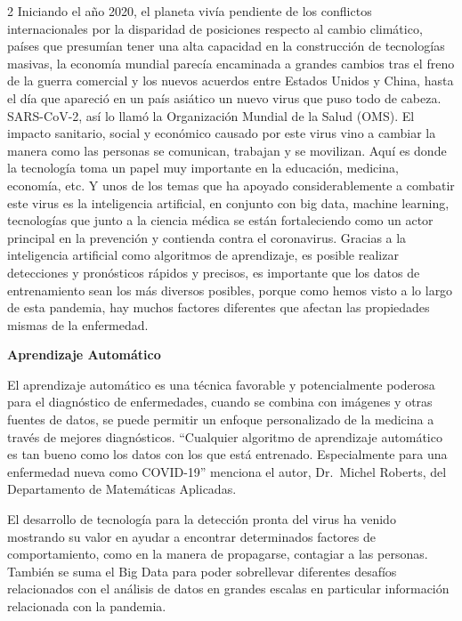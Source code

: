 \documentclass[12pt,spanish,Letterpaper,openany]{book}
\newcommand{\spacethreemilis}{\vspace{3mm}}
\begin{document}
\begin {multicols}{2}
Iniciando el año 2020, el planeta vivía pendiente de los conflictos internacionales por la
disparidad de posiciones respecto al cambio climático, países que presumían tener una alta
capacidad en la construcción de tecnologías masivas, la economía mundial parecía
encaminada a grandes cambios tras el freno de la guerra comercial y los nuevos acuerdos
entre Estados Unidos y China, hasta el día que apareció en un país asiático un nuevo virus
que puso todo de cabeza. SARS-CoV-2, así lo llamó la Organización Mundial de la Salud
(OMS).
El impacto sanitario, social y económico causado por este virus vino a cambiar la manera
como las personas se comunican, trabajan y se movilizan. Aquí es donde la tecnología toma
un papel muy importante en la educación, medicina, economía, etc. Y unos de los temas que
ha apoyado considerablemente a combatir este virus es la inteligencia artificial, en conjunto
con big data, machine learning, tecnologías que junto a la ciencia médica se están
fortaleciendo como un actor principal en la prevención y contienda contra el coronavirus.
Gracias a la inteligencia artificial como algoritmos de aprendizaje, es posible realizar
detecciones y pronósticos rápidos y precisos, es importante que los datos de entrenamiento
sean los más diversos posibles, porque como hemos visto a lo largo de esta pandemia, hay
muchos factores diferentes que afectan las propiedades mismas de la enfermedad.

\spacethreemilis

\textbf{Aprendizaje Automático}

El aprendizaje automático es una técnica favorable y potencialmente poderosa para el
diagnóstico de enfermedades, cuando se combina con imágenes y otras fuentes de datos, se
puede permitir un enfoque personalizado de la medicina a través de mejores diagnósticos.
``Cualquier algoritmo de aprendizaje automático es tan bueno como los datos con los que está
entrenado. Especialmente para una enfermedad nueva como COVID-19'' menciona el autor,
Dr.~Michel Roberts, del Departamento de Matemáticas Aplicadas.

El desarrollo de tecnología para la detección pronta del virus ha venido mostrando su valor
en ayudar a encontrar determinados factores de comportamiento, como en la manera de
propagarse, contagiar a las personas. También se suma el Big Data para poder sobrellevar
diferentes desafíos relacionados con el análisis de datos en grandes escalas en
particular información relacionada con la pandemia.

\spacethreemilis


\end{multicols}
\end{document}
